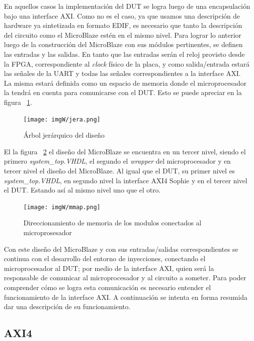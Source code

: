 \documentclass[a4paper,openright,12pt]{report}
\begin{document}
En aquellos casos  la implementación del DUT se logra luego de una encapsulación bajo una interface AXI. Como no es el caso, ya que usamos una descripción de hardware  ya sintetizada en formato EDIF, es necesario que tanto la descripción del circuito como el MicroBlaze estén en el mismo nivel.
Para lograr lo anterior luego de la construcción del MicroBlaze con sus módulos pertinentes, se definen las entradas y las salidas. En tanto que las entradas serán el reloj provisto desde la FPGA, correspondiente al \textit{clock} físico de la placa, y como salida/entrada estará las señales de la UART y todas las señales correspondientes a la interface AXI. La misma estará definida como un espacio de  memoria donde el microprocesador la tendrá en cuenta para comunicarse con el DUT. Esto se puede apreciar en la  figura ~\ref{jera}.

\begin{figure}[H]
	\centering
	\texttt{[image: imgW/jera.png]}
	\caption{Árbol jerárquico del diseño }
	\label{jera}
\end{figure}

El la figura ~\ref{mmap}  el diseño del MicroBlaze se encuentra en un tercer nivel, siendo el primero \textit{system\_top.VHDL}, el segundo el \textit{wrapper} del microprocesador y en tercer nivel el diseño del MicroBlaze. Al igual que el DUT, su primer nivel es \textit{system\_top.VHDL}, en segundo nivel la interface AXI4 Sophie y en el tercer nivel el DUT. Estando así al mismo nivel uno que el otro.

\begin{figure}[H]
	\centering
	\texttt{[image: imgW/mmap.png]}
	\caption{Direccionamiento de memoria de los modulos conectados al microprosesador}
	\label{mmap}
\end{figure}

Con este diseño del MicroBlaze y con sus entradas/salidas correspondientes se continua con el desarrollo del entorno de inyecciones, conectando el microprocesador al DUT; por medio de la interface AXI, quien será la responsable de comunicar al microprocesador y al circuito a someter. Para poder comprender cómo se logra esta comunicación es necesario entender el funcionamiento de la interface AXI.
A continuación se intenta en forma resumida dar una descripción de su funcionamiento.
 


\subsection{ AXI4}
\end{document}
